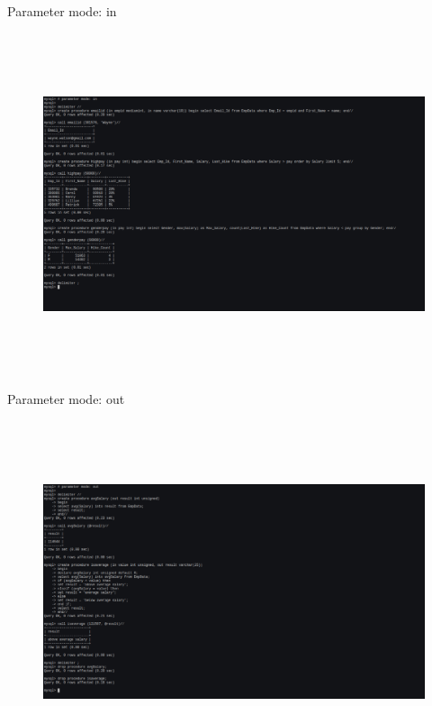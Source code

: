 \documentclass[a4paper,11pt,openright]{report}
\begin{document}
\pagebreak

{\footnotesize Parameter mode: in}
\begin{figure}[ht!]
\includegraphics[width=20cm,height=10cm,keepaspectratio]{image3.pdf}
\centering
\end{figure}

\vspace{20px}

{\footnotesize Parameter mode: out}
\begin{figure}[ht!]
\includegraphics[width=20cm,height=10cm,keepaspectratio]{image4.pdf}
\centering
\end{figure}

\pagebreak
\end{document}
